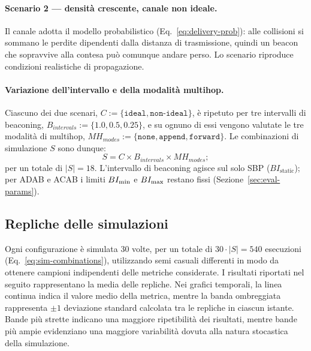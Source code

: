 \paragraph{Scenario 2 --- densit\`a crescente, canale non ideale.} Il canale
adotta il modello probabilistico (Eq.~\ref{eq:delivery-prob}): alle
collisioni si sommano le perdite dipendenti dalla distanza di trasmissione, quindi un beacon che
sopravvive alla contesa pu\`o comunque andare perso. Lo scenario riproduce
condizioni realistiche di propagazione.

\paragraph{Variazione dell'intervallo e della modalit\`a multihop.} Ciascuno dei due scenari, $C := \{\texttt{ideal}, \texttt{non-ideal}\}$, \`e ripetuto
per tre intervalli di beaconing, $B_{intervals}:=\{1.0, 0.5, 0.25\}$, e su ognuno di essi 
vengono valutate le tre modalit\`a di multihop, $MH_{modes}:=\{\texttt{none}, \texttt{append}, \texttt{forward}\}$.
Le combinazioni di simulazione $S$ sono dunque:
\begin{equation}
    S = C \times B_{intervals} \times MH_{modes};
\label{eq:sim-combinations}
\end{equation}
per un totale di $|S|=18$. L'intervallo di beaconing agisce sul solo SBP
($BI_{\text{static}}$); per ADAB e ACAB i limiti $BI_{\min}$ e $BI_{\max}$ restano
fissi (Sezione~\ref{sec:eval-params}).

\subsection{Repliche delle simulazioni}
\label{sec:eval-stats}
Ogni configurazione \`e simulata 30 volte, per un totale di
$30 \cdot |S| = 540$ esecuzioni (Eq.~\ref{eq:sim-combinations}), utilizzando
semi casuali differenti in modo da ottenere campioni indipendenti delle
metriche considerate. I risultati riportati nel seguito rappresentano la media
delle repliche. Nei grafici temporali, la linea continua indica il valore medio
della metrica, mentre la banda ombreggiata rappresenta $\pm 1$ deviazione
standard calcolata tra le repliche in ciascun istante. Bande pi\`u strette
indicano una maggiore ripetibilit\`a dei risultati, mentre bande pi\`u ampie
evidenziano una maggiore variabilit\`a dovuta alla natura stocastica della
simulazione.


